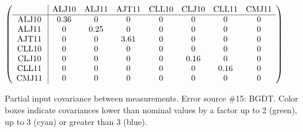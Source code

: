 \begin{table}[H]
\scriptsize
\begin{center}
\renewcommand{\arraystretch}{1.1}
\begin{math}\left(\begin{array}{c|ccccccc}
 & \mathrm{ALJ10} & 
\mathrm{ALJ11} & 
\mathrm{AJT11} & 
\mathrm{CLL10} & 
\mathrm{CLJ10} & 
\mathrm{CLL11} & 
\mathrm{CMJ11} \\
\hline
\mathrm{ALJ10} \hspace*{2pt} &       0.36 &  0 &  0 &  0 &  0 &  0 &  0 \\
\mathrm{ALJ11} \hspace*{2pt} &  0 &       0.25 &  0 &  0 &  0 &  0 &  0 \\
\mathrm{AJT11} \hspace*{2pt} &  0 &  0 &       3.61 &  0 &  0 &  0 &  0 \\
\mathrm{CLL10} \hspace*{2pt} &  0 &  0 &  0 &  0 &  0 &  0 &  0 \\
\mathrm{CLJ10} \hspace*{2pt} &  0 &  0 &  0 &  0 &       0.16 &  0 &  0 \\
\mathrm{CLL11} \hspace*{2pt} &  0 &  0 &  0 &  0 &  0 &       0.16 &  0 \\
\mathrm{CMJ11} \hspace*{2pt} &  0 &  0 &  0 &  0 &  0 &  0 &  0 \\
\end{array}\right)\end{math}
\caption{Partial input covariance between measurements. Error source \#15: BGDT. Color boxes indicate covariances lower than nominal values by a factor up to 2 (green), up to 3 (cyan) or greater than 3 (blue).}
\renewcommand{\arraystretch}{1}
\end{center}
\end{table}
